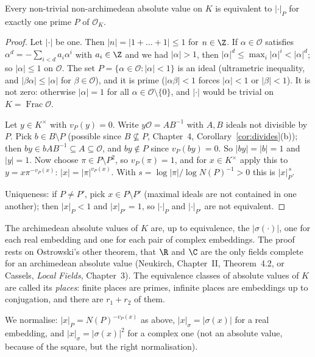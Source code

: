 \begin{theorem}\label{thm:ostrowskiK}
Every non-trivial non-archimedean absolute value on $K$ is equivalent to $|\cdot|_P$ for exactly one prime $P$ of
$\mathcal O_K$.
\end{theorem}
\begin{proof}
Let $|\cdot|$ be one. Then $|n|=|1+\dots+1|\le1$ for $n\in\Z$. If $\alpha\in\mathcal O$ satisfies $\alpha^d=-\sum_{i<d}a_i
\alpha^i$ with $a_i\in\Z$ and we had $|\alpha|>1$, then $|\alpha|^d\le\max_i|\alpha|^i<|\alpha|^d$; so $|\alpha|\le1$ on $\mathcal
O$. The set $P=\{\alpha\in\mathcal O:|\alpha|<1\}$ is an ideal (ultrametric inequality, and $|\beta\alpha|\le|\alpha|$ for
$\beta\in\mathcal O$), and it is prime ($|\alpha\beta|<1$ forces $|\alpha|<1$ or $|\beta|<1$). It is not zero: otherwise
$|\alpha|=1$ for all $\alpha\in\mathcal O\setminus\{0\}$, and $|\cdot|$ would be trivial on $K=\operatorname{Frac}\mathcal O$.

Let $y\in K^\times$ with $v_P(y)=0$. Write $y\mathcal O=AB^{-1}$ with $A,B$ ideals not divisible by $P$. Pick $b\in B\setminus P$
(possible since $B\not\subseteq P$, Chapter~4, Corollary~\ref{cor:divides}(b)); then $by\in bAB^{-1}\subseteq A\subseteq\mathcal O$,
and $by\notin P$ since $v_P(by)=0$. So $|by|=|b|=1$ and $|y|=1$. Now choose $\pi\in P\setminus P^2$, so $v_P(\pi)=1$, and for
$x\in K^\times$ apply this to $y=x\pi^{-v_P(x)}$: $|x|=|\pi|^{v_P(x)}$. With $s=\log|\pi|/\log N(P)^{-1}>0$ this is $|x|_P^{\,s}$.

Uniqueness: if $P\ne P'$, pick $x\in P\setminus P'$ (maximal ideals are not contained in one another); then $|x|_P<1$ and
$|x|_{P'}=1$, so $|\cdot|_P$ and $|\cdot|_{P'}$ are not equivalent.
\end{proof}

\begin{remark}
The archimedean absolute values of $K$ are, up to equivalence, the $|\sigma(\cdot)|$, one for each real embedding and one
for each pair of complex embeddings. The proof rests on Ostrowski's other theorem, that $\R$ and $\C$ are the only fields
complete for an archimedean absolute value (Neukirch, Chapter~II, Theorem~4.2, or Cassels, \emph{Local Fields}, Chapter~3).
The equivalence classes of absolute values of $K$ are called its \emph{places}: finite places are primes, infinite places
are embeddings up to conjugation, and there are $r_1+r_2$ of them.
\end{remark}

We normalise: $|x|_P=N(P)^{-v_P(x)}$ as above, $|x|_\sigma=|\sigma(x)|$ for a real embedding, and $|x|_\sigma=|\sigma(x)|^2$
for a complex one (not an absolute value, because of the square, but the right normalisation).

